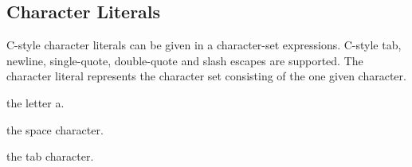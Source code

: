 
\subsection{Character Literals}
{
	C-style character literals can be given in a character-set expressions.
	C-style tab, newline, single-quote, double-quote and slash escapes are
	supported.
	The character literal represents the character set consisting of
	the one given character.
	
	\begin{itemize}
	{
		\item[\texttt{`a'}] the letter a.
		
		\item[\texttt{` '}] the space character.
		
		\item[\texttt{`\symbol{92}t'}] the tab character.
	}
	\end{itemize}
}
